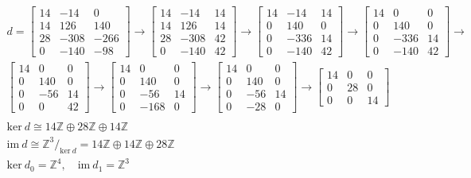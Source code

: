 		\begin{gather*}
			d = 
			\begin{bmatrix}
				{14} & {-14} & {0} \\
				{14} & {126} & {140} \\
				{28} & {-308} & {-266} \\
				{0} & {-140} & {-98}
			\end{bmatrix}
			\to
			\begin{bmatrix}
				{14} & {-14} & {14} \\
				{14} & {126} & {14} \\
				{28} & {-308} & {42} \\
				{0} & {-140} & {42}
			\end{bmatrix}
			\to
			\begin{bmatrix}
				{14} & {-14} & {14} \\
				{0} & {140} & {0} \\
				{0} & {-336} & {14} \\
				{0} & {-140} & {42}
			\end{bmatrix}
			\to
			\begin{bmatrix}
				{14} & {0} & {0} \\
				{0} & {140} & {0} \\
				{0} & {-336} & {14} \\
				{0} & {-140} & {42}
			\end{bmatrix}
			\to\\
			\begin{bmatrix}
				{14} & {0} & {0} \\
				{0} & {140} & {0} \\
				{0} & {-56} & {14} \\
				{0} & {0} & {42}
			\end{bmatrix}
			\to
			\begin{bmatrix}
				{14} & {0} & {0} \\
				{0} & {140} & {0} \\
				{0} & {-56} & {14} \\
				{0} & {-168} & {0}
			\end{bmatrix}
			\to
			\begin{bmatrix}
				{14} & {0} & {0} \\
				{0} & {140} & {0} \\
				{0} & {-56} & {14} \\
				{0} & {-28} & {0}
			\end{bmatrix}
			\to
			\begin{bmatrix}
				{14} & {0} & {0} \\
				{0} & {28} & {0} \\
				{0} & {0} & {14}
			\end{bmatrix}\\
			\\
			\text{ker}\: d \cong 14\mathbb{Z} \oplus 28\mathbb{Z} \oplus 14\mathbb{Z}\\
			\text{im}\: d \cong \mathbb{Z}^3\slash_{\text{ker}\: d} = 14\mathbb{Z} \oplus 14\mathbb{Z} \oplus 28\mathbb{Z}\\
			\text{ker}\: d_0 = \mathbb{Z}^4,\quad \text{im}\: d_1 = \mathbb{Z}^3
		\end{gather*}
